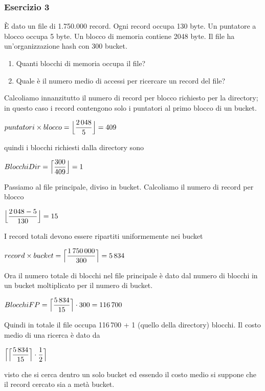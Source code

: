 \subsubsection{Esercizio 3}
\`E dato un file di 1.750.000 record. Ogni record occupa 130 byte. Un puntatore a blocco occupa 5 byte. 
Un blocco di memoria contiene 2048 byte. Il file ha un’organizzazione hash con 300 bucket.
\begin{enumerate}
 \item Quanti blocchi di memoria occupa il file?
 \item Quale è il numero medio di accessi per ricercare un record del file?
\end{enumerate}
\begin{multicols}{2}
Calcoliamo innanzitutto il numero di record per blocco richiesto per la directory; in questo
caso i record contengono solo i puntatori al primo blocco di un bucket.
\begin{center}
 $puntatori \times blocco = \Bigl\lfloor \dfrac{2\,048}{5} \Bigr\rfloor = 409$
\end{center}
quindi i blocchi richiesti dalla directory sono
\begin{center}
 $BlocchiDir = \Bigl\lceil \dfrac{300}{409} \Bigr\rfloor = 1$
\end{center}
Passiamo al file principale, diviso in bucket. Calcoliamo il numero di record per blocco
\begin{center}
 $\Bigl\lfloor \dfrac{2\,048-5}{130} \Bigr\rfloor = 15$
\end{center}
I record totali devono essere ripartiti uniformemente nei bucket
\begin{center}
 $record \times bucket = \Bigl\lceil \dfrac{1\,750\,000}{300} \Bigr\rceil = 5\,834$
\end{center}
Ora il numero totale di blocchi nel file principale è dato dal numero di blocchi in un bucket
moltiplicato per il numero di bucket.
\begin{center}
 $BlocchiFP = \Bigl\lceil \dfrac{5\,834}{15} \Bigr\rceil \cdot 300 = 116\,700$
\end{center}
Quindi in totale il file occupa 116\,700 + 1 (quello della directory) blocchi. Il costo medio di 
una ricerca è dato da
\begin{center}
 $\Bigl\lceil \Bigl\lceil \dfrac{5\,834}{15} \Bigr\rceil \cdot \dfrac{1}{2} \Bigr\rceil$
\end{center}
visto che si cerca dentro un solo bucket ed essendo il costo medio si suppone che il record
cercato sia a metà bucket.
\end{multicols}








